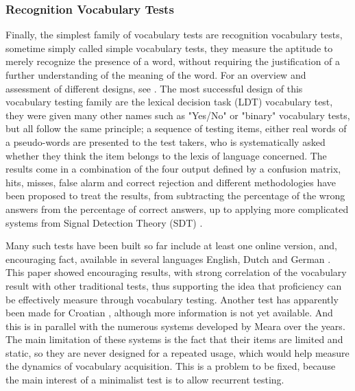         \subsubsection{Recognition Vocabulary Tests}
Finally, the simplest family of vocabulary tests are recognition vocabulary tests, sometime simply called simple vocabulary tests, they measure the aptitude to merely recognize the presence of a word, without requiring the justification of a further understanding of the meaning of the word. For an overview and assessment of different designs, see \cite{meara_complexities_1994}. The most successful design of this vocabulary testing family are the lexical decision task (LDT) vocabulary test, they were given many other names such as "Yes/No" or "binary" vocabulary tests, but all follow the same principle; a sequence of testing items, either real words of a pseudo-words \parencite{meara_imaginary_2012} are presented to the test takers, who is systematically asked whether they think the item belongs to the lexis of language concerned. The results come in a combination of the four output defined by a confusion matrix, hits, misses, false alarm and correct rejection and different methodologies have been proposed to treat the results, from subtracting the percentage of the wrong answers from the percentage of correct answers, up to applying more complicated systems from Signal Detection Theory (SDT) \parencite{huibregtse_scores_2002}.

Many such tests have been built so far include at least one online version, and, encouraging fact, available in several languages English, Dutch and German \parencite{lemhofer_introducing_2012}. This paper showed encouraging results, with strong correlation of the vocabulary result with other traditional tests, thus supporting the idea that proficiency can be effectively measure through vocabulary testing. Another test has apparently been made for Croatian \parencite{srce_how_2025}, although more information is not yet available. And this is in parallel with the numerous systems developed by Meara over the years\cite{meara_complexities_1994}. The main limitation of these systems is the fact that their items are limited and static, so they are never designed for a repeated usage, which would help measure the dynamics of vocabulary acquisition. This is a problem to be fixed, because the main interest of a minimalist test is to allow recurrent testing.

